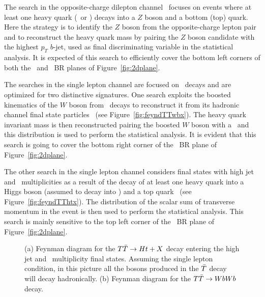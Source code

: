 The search in the opposite-charge dilepton channel~\cite{ATLAS-CONF-2013-056} 
focuses on events where at least one
heavy quark  (\B\ or \T) decays into a $Z$ boson and a bottom (top) quark. 
Here the strategy is to identify the $Z$ boson from the opposite-charge lepton
pair and to reconstruct the heavy quark mass 
by pairing the $Z$ boson candidate with the highest 
$p_T$ $b$-jet, used as final discriminating variable in the statistical analysis.
It is expected of this search to efficiently cover the bottom
left corners of both the \B\ and \T\ BR planes of
Figure~\ref{fig:2dplane}.


The searches in the single lepton channel are focused on \TT\ 
decays and are optimized for two distinctive signatures. One search
exploits the boosted kinematics of the $W$ boson from \T\ decays
to reconstruct it from its hadronic channel final state 
particles~\cite{ATLAS-CONF-2013-060} (see Figure~\ref{fig:feyndTTwbx}). The heavy quark invariant mass is 
then reconstructed pairing the boosted  $W$ boson  with a \bjet\ and this
distribution is used to perform the statistical analysis. It is evident that this
search is going to cover the bottom right corner of the \T\  BR plane 
of Figure~\ref{fig:2dplane}.

The other search in the single lepton channel considers final states with high
jet and \bjet\ multiplicities as a result of the decay of at least one heavy quark
into a Higgs boson (assumed to decay into \bbbar) and a top 
quark~\cite{ATLAS-CONF-2013-018} (see Figure~\ref{fig:feyndTThtx}). The distribution
of the scalar sum of transverse momentum in the event is then used to perform the statistical 
analysis. This search is mainly sensitive to the top left corner of the \T\  
BR plane of Figure~\ref{fig:2dplane}.


\begin{figure}[hbt]
\begin{center}
        \myskip\myskip
	\caption{(a) Feynman diagram for the $\TTbar\to Ht+X$
        decay entering the high jet and \bjet\ multiplicity final states.
        Assuming the single lepton condition, in this picture all the bosons 
        produced in the $\Tbar$ decay will decay hadronically.
        (b) Feynman diagram for the $\TTbar\to WbWb$ decay.\label{fig:feyndHTX}}
\end{center}
\end{figure}



